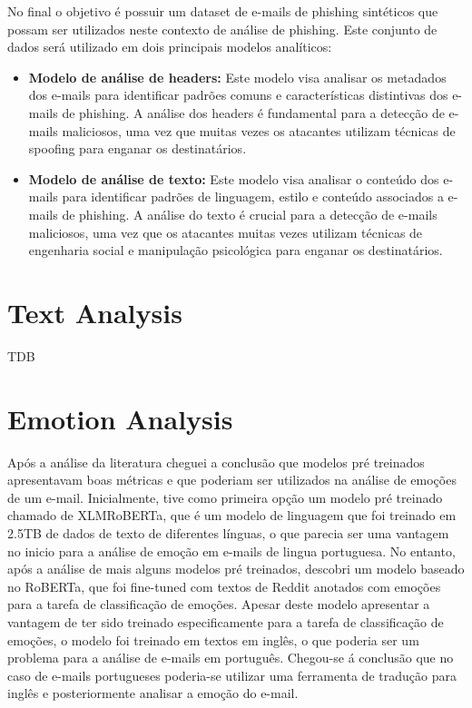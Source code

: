 No final o objetivo é possuir um dataset de e-mails de phishing sintéticos que possam ser utilizados neste contexto de análise de phishing.
Este conjunto de dados será utilizado em dois principais modelos analíticos:
\begin{itemize}
    \item \textbf{Modelo de análise de headers:} Este modelo visa analisar os metadados dos e-mails para identificar padrões comuns e características distintivas dos e-mails de phishing. A análise dos headers é fundamental para a detecção de e-mails maliciosos, uma vez que muitas vezes os atacantes utilizam técnicas de spoofing para enganar os destinatários.
    \item \textbf{Modelo de análise de texto:} Este modelo visa analisar o conteúdo dos e-mails para identificar padrões de linguagem, estilo e conteúdo associados a e-mails de phishing. A análise do texto é crucial para a detecção de e-mails maliciosos, uma vez que os atacantes muitas vezes utilizam técnicas de engenharia social e manipulação psicológica para enganar os destinatários.
\end{itemize}

\section{Text Analysis}
TDB

\section{Emotion Analysis}

Após a análise da literatura cheguei a conclusão que modelos pré treinados apresentavam boas métricas e que poderiam ser utilizados na análise de emoções de um e-mail. 
Inicialmente, tive como primeira opção um modelo pré treinado chamado de XLMRoBERTa, que é um modelo de linguagem que foi treinado em 2.5TB de dados de texto de diferentes línguas, o que parecia ser uma vantagem no inicio para a análise de emoção em e-mails de lingua portuguesa.
No entanto, após a análise de mais alguns modelos pré treinados, descobri um modelo baseado no RoBERTa, que foi fine-tuned com textos de Reddit anotados com emoções para a tarefa de classificação de emoções.
Apesar deste modelo apresentar a vantagem de ter sido treinado especificamente para a tarefa de classificação de emoções, o modelo foi treinado em textos em inglês, o que poderia ser um problema para a análise de e-mails em português. Chegou-se á conclusão que no caso de e-mails portugueses poderia-se utilizar uma ferramenta de tradução para inglês e posteriormente analisar a emoção do e-mail.

